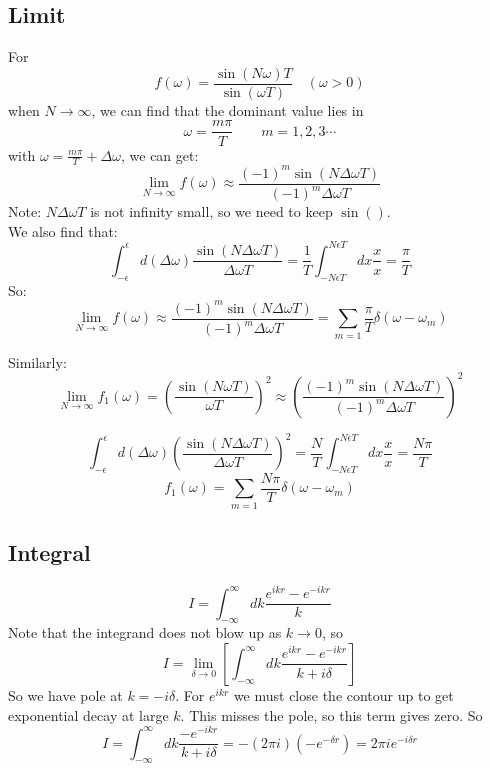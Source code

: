\subsection{Limit}
For 
\[
    f(\omega) = \frac{\sin(N\omega)T}{\sin(\omega T)}   \quad (\omega > 0)
    \]
when $N\rightarrow\infty$, 
we can find that the dominant value lies in 
\[
    \omega = \frac{m\pi}{T} \qquad  m=1,2,3 \cdots
    \]
with $\omega=\frac{m\pi}{T}+\Delta\omega$, we can get:
\begin{equation}
    \displaystyle \lim_{N\rightarrow\infty}f(\omega)\approx\frac{(-1)^m\sin(N\Delta\omega T)}{(-1)^m\Delta\omega T}
\end{equation}
Note: $N\Delta\omega T$ is not infinity small, so we need to keep $\sin()$. \\
We also find that:
\begin{equation}
    \int_{-\epsilon}^{\epsilon}d(\Delta\omega)\frac{\sin(N\Delta\omega T)}{\Delta\omega T}
    =\frac{1}{T}\int_{-N\epsilon T}^{N\epsilon T} dx\frac{x}{x} = \frac{\pi}{T}
\end{equation}
So: 
\begin{equation}
    \displaystyle \lim_{N\rightarrow\infty}f(\omega)\approx\frac{(-1)^m\sin(N\Delta\omega T)}{(-1)^m\Delta\omega T}
    =\displaystyle \sum_{m=1}\frac{\pi}{T}\delta({\omega-\omega_m})
\end{equation}

Similarly:
\begin{equation}
    \displaystyle \lim_{N\rightarrow\infty}f_1(\omega)=\left(\frac{\sin(N\omega T)}{\omega T}\right)^2
    \approx\left(\frac{(-1)^m\sin(N\Delta\omega T)}{(-1)^m\Delta\omega T}\right)^2
\end{equation}

\begin{equation}
    \int_{-\epsilon}^{\epsilon}d(\Delta\omega)\left(\frac{\sin(N\Delta\omega T)}{\Delta\omega T}\right)^2
    =\frac{N}{T}\int_{-N\epsilon T}^{N\epsilon T} dx\frac{x}{x}
    =\frac{N\pi}{T}
\end{equation}
\begin{equation}
    f_1(\omega)=\displaystyle \sum_{m=1}\frac{N\pi}{T}\delta({\omega-\omega_m})
\end{equation}

\subsection{Integral}
\[
    I=\int_{-\infty}^{\infty}dk\frac{e^{ikr}-e^{-ikr}}{k}
    \]
Note that the integrand does not blow up as $k \rightarrow 0$, so
\[
    I=\displaystyle\lim_{\delta\rightarrow{0}}\left[\int_{-\infty}^{\infty}dk\frac{e^{ikr}-e^{-ikr}}{k+i\delta}\right]
    \]
So we have pole at $k = -i\delta$. For $e^{ikr}$ we must close the contour
up to get exponential decay at large $\mathit{k}$. This misses the pole, so
this term gives zero. So
\[
    I=\int_{-\infty}^{\infty}dk\frac{-e^{-ikr}}{k+i\delta}=-(2\pi{i})(-e^{-\delta{r}})=2\pi{i}e^{-i\delta{r}}
    \]

